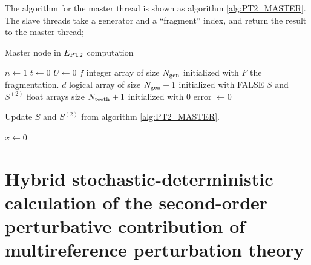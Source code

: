 \documentclass[./thesis.tex]{subfiles}
\begin{document}
The algorithm for the master thread is shown as algorithm \ref{alg:PT2_MASTER}. The slave threads take a generator and a ``fragment'' index, and return the result to the master thread;

\begin{algorithm}
	\caption{Master node in $E_\text{PT2}$ computation}
	\label{alg:PT2_MASTER}
	$n \gets 1$ \;
	$t \gets 0$ \;
	$U \gets 0$ \;
	$f$ integer array of size ${N_\text{gen}}$ initialized with $F$ the fragmentation. \;
	$d$ logical array of size ${N_\text{gen}}+1$ initialized with FALSE \;
	$S$ and $S^{(2)}$ float arrays size $N_\text{teeth}+1$ initialized with $0$ \;
        error $\gets 0$ \;
\end{algorithm}


\begin{algorithm}
	\caption{Update $S$ and $S^{(2)}$ from algorithm \ref{alg:PT2_MASTER}.}
	\label{alg:UPDATE_S}
	
					
	$x \gets 0$ \;
\end{algorithm}



\clearpage

\section{Hybrid stochastic-deterministic calculation of the second-order
perturbative contribution of multireference perturbation theory}

\end{document}
